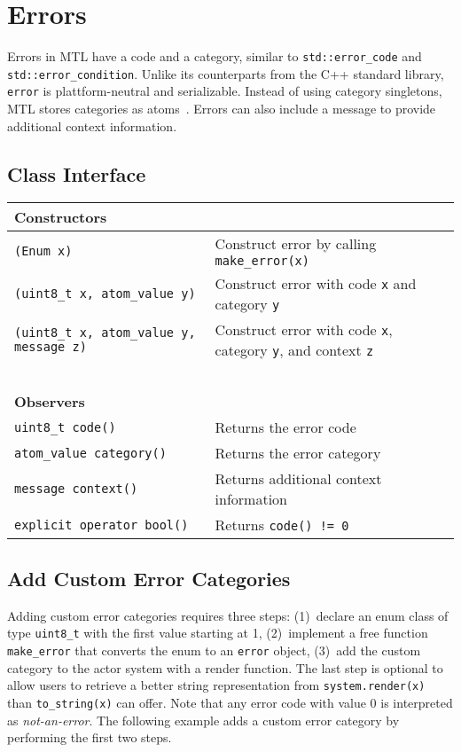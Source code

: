 \section{Errors}
\label{error}

Errors in MTL have a code and a category, similar to
\lstinline^std::error_code^ and \lstinline^std::error_condition^. Unlike its
counterparts from the C++ standard library, \lstinline^error^ is
plattform-neutral and serializable. Instead of using category singletons, MTL
stores categories as atoms~. Errors can also include a message to
provide additional context information.

\subsection{Class Interface}

\begin{center}
\begin{tabular}{ll}
  \textbf{Constructors} & ~ \\
  \hline
  \lstinline^(Enum x)^ & Construct error by calling \lstinline^make_error(x)^ \\
  \hline
  \lstinline^(uint8_t x, atom_value y)^ & Construct error with code \lstinline^x^ and category \lstinline^y^ \\
  \hline
  \lstinline^(uint8_t x, atom_value y, message z)^ & Construct error with code \lstinline^x^, category \lstinline^y^, and context \lstinline^z^ \\
  \hline
  ~ & ~ \\ \textbf{Observers} & ~ \\
  \hline
  \lstinline^uint8_t code()^ & Returns the error code \\
  \hline
  \lstinline^atom_value category()^ & Returns the error category \\
  \hline
  \lstinline^message context()^ & Returns additional context information \\
  \hline
  \lstinline^explicit operator bool()^ & Returns \lstinline^code() != 0^ \\
  \hline
\end{tabular}
\end{center}

\subsection{Add Custom Error Categories}
\label{custom-error}

Adding custom error categories requires three steps: (1)~declare an enum class
of type \lstinline^uint8_t^ with the first value starting at 1, (2)~implement a
free function \lstinline^make_error^ that converts the enum to an
\lstinline^error^ object, (3)~add the custom category to the actor system with
a render function. The last step is optional to allow users to retrieve a
better string representation from \lstinline^system.render(x)^ than
\lstinline^to_string(x)^ can offer. Note that any error code with value 0 is
interpreted as \emph{not-an-error}. The following example adds a custom error
category by performing the first two steps.

